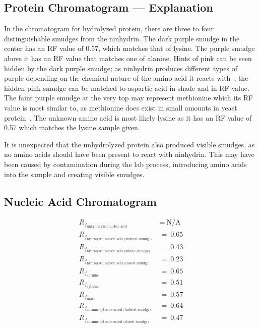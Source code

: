     \subsection*{Protein Chromatogram --- Explanation}
    In the chromatogram for hydrolyzed protein, there are three to four distinguishable smudges from the ninhydrin. The dark purple smudge in the center has an RF value of 0.57, which matches that of lysine. The purple smudge above it has an RF value that matches one of alanine. Hints of pink can be seen hidden by the dark purple smudge; as ninhydrin produces different types of purple depending on the chemical nature of the amino acid it reacts with~\citep{PERRETT2014598}, the hidden pink smudge can be matched to aspartic acid in shade and in RF value. The faint purple smudge at the very top may represent methionine which its RF value is most similar to, as methionine does exist in small amounts in yeast protein~\citep{cjf-201606-0012}. The unknown amino acid is most likely lysine as it has an RF value of 0.57 which matches the lysine sample given. \par
    It is unexpected that the unhydrolyzed protein also produced visible smudges, as no amino acids should have been present to react with ninhydrin. This may have been caused by contamination during the lab process, introducing amino acids into the sample and creating visible smudges.
    \subsection*{Nucleic Acid Chromatogram}
    \begin{align*}
        R_{f_{\text{unhydrolyzed nucleic acid}}}\
        &=\ \text{N/A}\\
        R_{f_{\text{hydrolyzed nucleic acid (furthest smudge)}}}\
        &=\ 0.65\\
        R_{f_{\text{hydrolyzed nucleic acid (middle smudge)}}}\
        &=\ 0.43\\
        R_{f_{\text{hydrolyzed nucleic acid (closest smudge)}}}\
        &=\ 0.23\\
        R_{f_{\text{adenine}}}\
        &=\ 0.65\\
        R_{f_{\text{cytosine}}}\
        &=\ 0.51\\
        R_{f_{\text{uracil}}}\
        &=\ 0.57\\
        R_{f_{\text{adenine-cytosine-uracil (furthest smudge)}}}\
        &=\ 0.64\\
        R_{f_{\text{adenine-cytosine-uracil (closest smudge)}}}\
        &=\ 0.47
    \end{align*}
